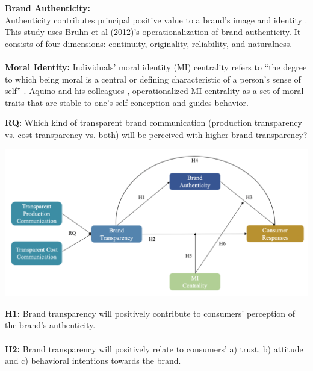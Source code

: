 \documentclass[a0,portrait]{a0poster}
\begin{document}
\begin{minipage}[c]{\linewidth}
\begin{framed}
\begin{multicols}{2}
  \color{Maroon} \textbf{Brand Authenticity:} \color{Black} \\
  Authenticity contributes principal positive value to a brand's image \autocite{keller_strategic_1998}\autocite{ballantyne_evolution_2006}  and identity \autocite{beverland_crafting_2005}\autocite{kapferer_new_2008}. 
  This study uses Bruhn et al (2012)'s operationalization of brand authenticity. It consists of four dimensions: continuity, originality, reliability, and naturalness.
\\ 
\\
    \color{Maroon} \textbf{Moral Identity:} \color{Black}Individuals’ moral identity (MI) centrality refers to “the degree to which being moral is a central or defining characteristic of a person’s sense of self” \autocite{blasi_moral_1994}.
    Aquino and his colleagues \autocite{aquino_self-importance_2002}\autocite{aquino_testing_2009}, operationalized MI centrality as a set of moral traits that are stable to one’s self-conception and guides behavior. 
    \\
   \begin{center}
  \color{Maroon} \textbf{RQ:} \color{Black}  Which kind of transparent brand communication (production transparency vs. cost transparency vs. both) will be perceived with higher brand transparency? \\
  \end{center}
\begin{center}
\includegraphics[width=0.9\linewidth]{figures/Figure1}
\label{ALICerros}
\end{center}
\color{Maroon}
\textbf{H1:} \color{Black}Brand transparency will positively contribute to consumers' perception of the brand's authenticity. \\
\\
\color{Maroon}
\textbf{H2:} \color{Black} Brand transparency will positively relate to consumers’ a) trust, b) attitude and c) behavioral intentions towards the brand.\\

\end{multicols}
\end{framed}
\end{minipage}
\end{document}
